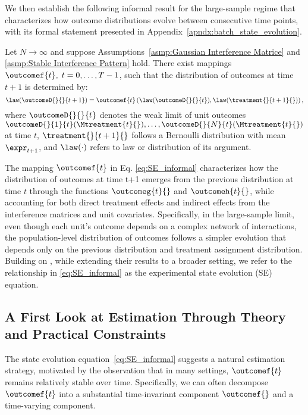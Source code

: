 We then establish the following informal result for the large-sample regime that characterizes how outcome distributions evolve between consecutive time points, with its formal statement presented in Appendix~\ref{apndx:batch_state_evolution}.
% 
\begin{theorem}
    \label{thm:SE_informal}
    Let $N \to \infty$ and suppose Assumptions~\ref{asmp:Gaussian Interference Matrice} and \ref{asmp:Stable Interference Pattern} hold. There exist mappings $\outcomef{t},\; t=0, \ldots, T-1$, such that the distribution of outcomes at time $t+1$ is determined by:
    \begin{equation}
        \label{eq:SE_informal}
        \law(
        \outcomeD{}{}{t+1})
        =
        \outcomef{t}\left(
        \law(
        \outcomeD{}{}{t}
        ),
        \law(
        \treatment{}{t+1}{}
        )
        \right),
    \end{equation}
    where $\outcomeD{}{}{t}$ denotes the weak limit of unit outcomes $\outcomeD{}{1}{t}(\Mtreatment{t}{}), \ldots, \outcomeD{}{N}{t}(\Mtreatment{t}{})$ at time $t$, $\treatment{}{t+1}{}$ follows a Bernoulli distribution with mean $\expr_{t+1}$, and $\law(\cdot)$ refers to law or distribution of its argument.
\end{theorem}
% 
The mapping $\outcomef{t}$ in Eq. \eqref{eq:SE_informal} characterizes how the distribution of outcomes at time t+1 emerges from the previous distribution at time $t$ through the functions $\outcomeg{t}{}$ and $\outcomeh{t}{}$, while accounting for both direct treatment effects and indirect effects from the interference matrices and unit covariates. Specifically, in the large-sample limit, even though each unit's outcome depends on a complex network of interactions, the population-level distribution of outcomes follows a simpler evolution that depends only on the previous distribution and treatment assignment distribution. Building on \citep{shirani2024causal}, while extending their results to a broader setting, we refer to the relationship in \eqref{eq:SE_informal} as the experimental state evolution (SE) equation.


\subsection{A First Look at Estimation Through Theory and Practical Constraints}
\label{sec:estimation_theory_informal}


The state evolution equation~\eqref{eq:SE_informal} suggests a natural estimation strategy, motivated by the observation that in many settings, $\outcomef{t}$ remains relatively stable over time. Specifically, we can often decompose $\outcomef{t}$ into a substantial time-invariant component $\outcomef{}$ and a time-varying component. 

